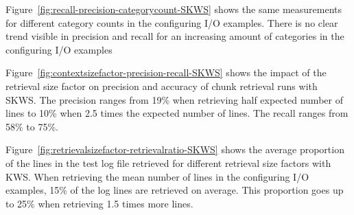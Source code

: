 \documentclass[\myrootdir/main.tex]{subfiles}
\begin{document}
Figure~\ref{fig:recall-precision-categorycount-SKWS} shows the same measurements for different category counts in the configuring I/O examples.
There is no clear trend visible in precision and recall for an increasing amount of categories in the configuring I/O examples

Figure~\ref{fig:contextsizefactor-precision-recall-SKWS} shows the impact of the retrieval size factor on precision and accuracy of chunk retrieval runs with SKWS.
The precision ranges from 19\% when retrieving half expected number of lines to 10\% when 2.5 times the expected number of lines.
The recall ranges from 58\% to 75\%.

Figure~\ref{fig:retrievalsizefactor-retrievalratio-SKWS} shows the average proportion of the lines in the test log file retrieved for different retrieval size factors with KWS.
When retrieving the mean number of lines in the configuring I/O examples, 15\% of the log lines are retrieved on average.
This proportion goes up to 25\% when retrieving 1.5 times more lines.
\end{document}
